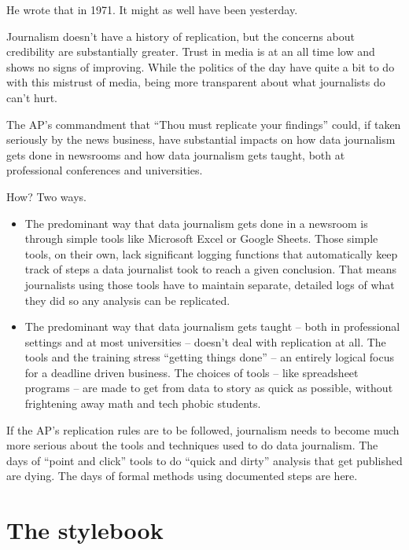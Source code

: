 \documentclass[
  letterpaper,
  DIV=11,
  numbers=noendperiod]{scrreprt}
\providecommand{\tightlist}{%
  \setlength{\itemsep}{0pt}\setlength{\parskip}{0pt}}\usepackage{longtable,booktabs,array}
\begin{document}
He wrote that in 1971. It might as well have been yesterday.

Journalism doesn't have a history of replication, but the concerns about
credibility are substantially greater. Trust in media is at an all time
low and shows no signs of improving. While the politics of the day have
quite a bit to do with this mistrust of media, being more transparent
about what journalists do can't hurt.

The AP's commandment that ``Thou must replicate your findings'' could,
if taken seriously by the news business, have substantial impacts on how
data journalism gets done in newsrooms and how data journalism gets
taught, both at professional conferences and universities.

How? Two ways.

\begin{itemize}
\tightlist
\item
  The predominant way that data journalism gets done in a newsroom is
  through simple tools like Microsoft Excel or Google Sheets. Those
  simple tools, on their own, lack significant logging functions that
  automatically keep track of steps a data journalist took to reach a
  given conclusion. That means journalists using those tools have to
  maintain separate, detailed logs of what they did so any analysis can
  be replicated.
\item
  The predominant way that data journalism gets taught -- both in
  professional settings and at most universities -- doesn't deal with
  replication at all. The tools and the training stress ``getting things
  done'' -- an entirely logical focus for a deadline driven business.
  The choices of tools -- like spreadsheet programs -- are made to get
  from data to story as quick as possible, without frightening away math
  and tech phobic students.
\end{itemize}

If the AP's replication rules are to be followed, journalism needs to
become much more serious about the tools and techniques used to do data
journalism. The days of ``point and click'' tools to do ``quick and
dirty'' analysis that get published are dying. The days of formal
methods using documented steps are here.

\hypertarget{the-stylebook}{%
\section{The stylebook}\label{the-stylebook}}
\end{document}
